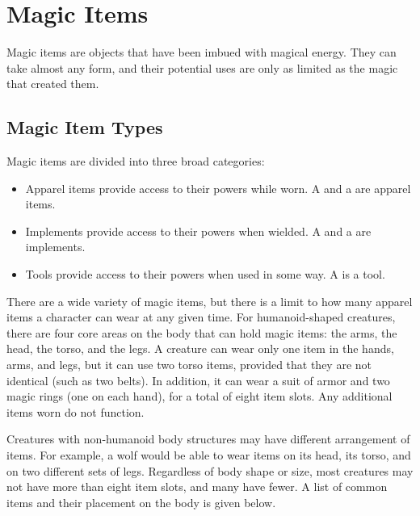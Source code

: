 \chapter{Magic Items}
Magic items are objects that have been imbued with magical energy. They can take almost any form, and their potential uses are only as limited as the magic that created them.

\section{Magic Item Types}
Magic items are divided into three broad categories:
\begin{itemize}
  \item Apparel items provide access to their powers while worn. A  and a  are apparel items.
  \item Implements provide access to their powers when wielded. A  and a  are implements.
  \item Tools provide access to their powers when used in some way. A  is a tool.
\end{itemize}

 There are a wide variety of magic items, but there is a limit to how many apparel items a character can wear at any given time. For humanoid-shaped creatures, there are four core areas on the body that can hold magic items: the arms, the head, the torso, and the legs. A creature can wear only one item in the hands, arms, and legs, but it can use two torso items, provided that they are not identical (such as two belts). In addition, it can wear a suit of armor and two magic rings (one on each hand), for a total of eight item slots. Any additional items worn do not function.

Creatures with non-humanoid body structures may have different arrangement of items. For example, a wolf would be able to wear items on its head, its torso, and on two different sets of legs. Regardless of body shape or size, most creatures may not have more than eight item slots, and many have fewer. A list of common items and their placement on the body is given below.

